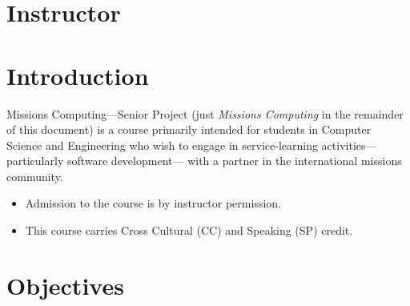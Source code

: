 \documentclass[11pt]{article}
\begin{document}
\section{Instructor}


\section{Introduction}

Missions Computing---Senior Project
(just \emph{Missions Computing} in the remainder of this document)
is a course primarily intended
for students in Computer Science and Engineering
who wish to engage in service-learning activities---%
particularly software development---%
with a partner in the international missions community.
\begin{itemize}
\item
  Admission to the course is by instructor permission.
\item
  This course carries Cross Cultural (CC)
  and Speaking (SP) credit.
\end{itemize}

\section{Objectives}
\end{document}
